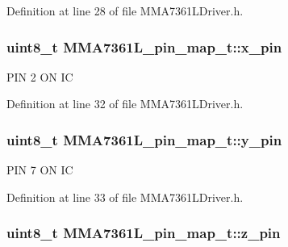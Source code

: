 \-Definition at line 28 of file \-M\-M\-A7361\-L\-Driver.\-h.

\hypertarget{struct_m_m_a7361_l__pin__map__t_a93ff68d61b4910dbfd6787ca60bfa882}{
\subsubsection[{x\-\_\-pin}]{\setlength{\rightskip}{0pt plus 5cm}uint8\-\_\-t {\bf \-M\-M\-A7361\-L\-\_\-pin\-\_\-map\-\_\-t\-::x\-\_\-pin}}}\label{struct_m_m_a7361_l__pin__map__t_a93ff68d61b4910dbfd6787ca60bfa882}

\begin{DoxyItemize}
\item \-P\-I\-N 2 \-O\-N \-I\-C 
\end{DoxyItemize}

\-Definition at line 32 of file \-M\-M\-A7361\-L\-Driver.\-h.

\hypertarget{struct_m_m_a7361_l__pin__map__t_a9fbc83dd8760370181cb1aec9e2ac764}{
\subsubsection[{y\-\_\-pin}]{\setlength{\rightskip}{0pt plus 5cm}uint8\-\_\-t {\bf \-M\-M\-A7361\-L\-\_\-pin\-\_\-map\-\_\-t\-::y\-\_\-pin}}}\label{struct_m_m_a7361_l__pin__map__t_a9fbc83dd8760370181cb1aec9e2ac764}

\begin{DoxyItemize}
\item \-P\-I\-N 7 \-O\-N \-I\-C 
\end{DoxyItemize}

\-Definition at line 33 of file \-M\-M\-A7361\-L\-Driver.\-h.

\hypertarget{struct_m_m_a7361_l__pin__map__t_a63f6c5410647242973e4b95f7dfcab9f}{
\subsubsection[{z\-\_\-pin}]{\setlength{\rightskip}{0pt plus 5cm}uint8\-\_\-t {\bf \-M\-M\-A7361\-L\-\_\-pin\-\_\-map\-\_\-t\-::z\-\_\-pin}}}\label{struct_m_m_a7361_l__pin__map__t_a63f6c5410647242973e4b95f7dfcab9f}

